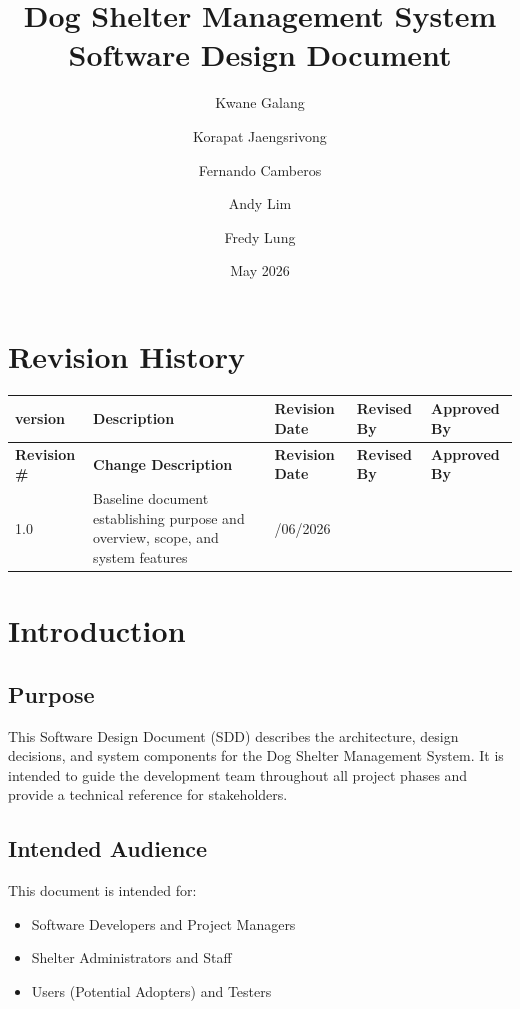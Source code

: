 \documentclass[12pt]{article}
\title{Dog Shelter Management System\\Software Design Document}
\author{Kwane Galang\\\and Korapat Jaengsrivong\\\and Fernando Camberos \\ \and Andy Lim \\ \and Fredy Lung \\}
\date{May 2026}
\begin{document}
\maketitle

\newpage
\tableofcontents
\section*{Revision History}

\begin{longtable}{|>{\centering\arraybackslash}p{2cm}|%
>{\raggedright\arraybackslash}p{3.5cm}|%
>{\centering\arraybackslash}p{2.5cm}|%
>{\centering\arraybackslash}p{2.5cm}|%
>{\centering\arraybackslash}p{2.5cm}|}
    \hline
    \textbf{version} & \textbf{Description} & \textbf{Revision Date} & \textbf{Revised By} & \textbf{Approved By} \\
    \hline
    \endfirsthead
 
    \hline
    \textbf{Revision \#} & \textbf{Change Description} & \textbf{Revision Date} & \textbf{Revised By} & \textbf{Approved By} \\
    \hline
    \endhead
 
    1.0 & Baseline document establishing purpose and overview, scope, and system features & 05/06/2026 &  & \\
    \hline
\end{longtable}
\newpage
\section{Introduction}

\subsection{Purpose}
This Software Design Document (SDD) describes the architecture, design decisions, and system components for the Dog Shelter Management System. It is intended to guide the development team throughout all project phases and provide a technical reference for stakeholders.
 
\subsection{Intended Audience}
This document is intended for:
\begin{itemize}
    \item Software Developers and Project Managers
    \item Shelter Administrators and Staff
    \item Users (Potential Adopters) and Testers
\end{itemize}
 
\end{document}

